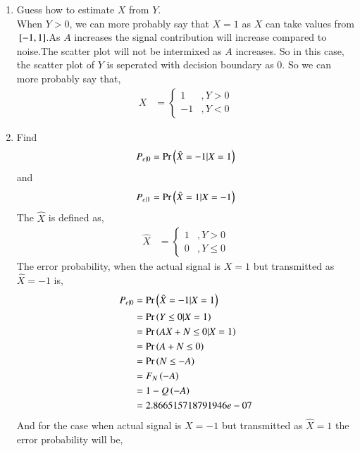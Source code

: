 \documentclass[journal,12pt,twocolumn]{IEEEtran}
\renewcommand\thesection{\arabic{section}}
\begin{document}
\begin{enumerate}[label=\thesection.\arabic*,ref=\thesection.\theenumi]
\begin{enumerate}[label=\thesection.\arabic*
,ref=\thesection.\theenumi]
\begin{figure}
   		\centering
   		\texttt{[image: Q5/Y.png]}
   		\caption{The scatter plot of $Y$}
   		\label{fig:Y_scatterplot}
   	\end{figure}
\item Guess how to estimate $X$ from $Y$.\\
	\solution When $ Y > 0 $, we can more probably say that $X = 1$ as $X$ can take values from ${}\left[-1,1\right]$.As $A$ increases the signal contribution will increase compared to noise.The scatter plot will not be intermixed as $A$ increases. So in this case, the scatter plot of $Y$ is seperated with decision boundary as $0$. So we can more probably say that,
	  \begin{align}
		  X &= \begin{cases}
			  1 &, Y>0\\
			 -1 &, Y<0 
		       \end{cases}
          \end{align}		       
\item
\label{ml-ch4_sim}
Find
\begin{equation}
	P_{e|0} = \Pr\left(\hat{X} = -1|X=1\right)
\end{equation}
and
\begin{equation}
	P_{e|1} = \Pr\left(\hat{X} = 1|X=-1\right)
\end{equation}
%
\solution The $\hat{X}$ is defined as,
  \begin{align}
      \hat{X} &= \begin{cases}
	             1  &, Y > 0\\
		     0  &, Y\leq 0
		 \end{cases}
  \end{align}
 The error probability, when the actual signal is $X=1$ but transmitted as $\hat{X} = -1$ is,
  \begin{align}
	  P_{e|0} &= \Pr\left(\hat{X} = -1|X=1\right)\\
	          &= \Pr\left( Y \leq 0| X= 1\right)\\
		  &= \Pr\left(AX + N \leq 0 | X=1\right)\\
		  &= \Pr\left( A + N \leq 0\right)\\
		  &= \Pr\left(N \leq -A\right)\\
		  &= F_{N}\left(-A\right)\\
		  &= 1 - Q\left(-A\right)\\
		  &= 2.866515718791946e-07\label{eq:5-5-1}
  \end{align}
 And for the case when actual signal is $X=-1$ but transmitted as $\hat{X} = 1$ the error probability will be,
  \begin{align}

\end{align}
\end{enumerate}
\end{enumerate}
\end{document}
